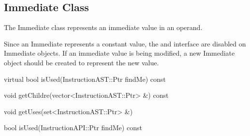 \subsection{Immediate Class}
\label{sec:immediate}

The Immediate class represents an immediate value in an operand.

Since an Immediate represents a constant value, the  and
 interface are disabled on Immediate objects. If an immediate
value is being modified, a new Immediate object should be created to represent
the new value. 

\begin{apient}
virtual bool isUsed(InstructionAST::Ptr findMe) const
\end{apient}

\begin{apient}
void getChildre(vector<InstructionAST::Ptr> &) const
\end{apient}

\begin{apient}
void getUses(set<InstructionAST::Ptr> &)
\end{apient}

\begin{apient}
bool isUsed(InstructionAPI::Ptr findMe) const
\end{apient}


